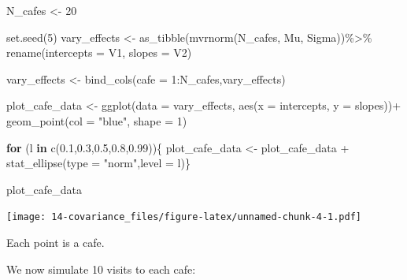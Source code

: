 \documentclass[
]{book}
\newenvironment{Shaded}{\begin{snugshade}}{\end{snugshade}}
\newcommand{\AttributeTok}[1]{\textcolor[rgb]{0.77,0.63,0.00}{#1}}
\newcommand{\ControlFlowTok}[1]{\textcolor[rgb]{0.13,0.29,0.53}{\textbf{#1}}}
\newcommand{\DecValTok}[1]{\textcolor[rgb]{0.00,0.00,0.81}{#1}}
\newcommand{\FloatTok}[1]{\textcolor[rgb]{0.00,0.00,0.81}{#1}}
\newcommand{\FunctionTok}[1]{\textcolor[rgb]{0.00,0.00,0.00}{#1}}
\newcommand{\NormalTok}[1]{#1}
\newcommand{\OtherTok}[1]{\textcolor[rgb]{0.56,0.35,0.01}{#1}}
\newcommand{\SpecialCharTok}[1]{\textcolor[rgb]{0.00,0.00,0.00}{#1}}
\newcommand{\StringTok}[1]{\textcolor[rgb]{0.31,0.60,0.02}{#1}}
\begin{document}
\begin{Shaded}
\begin{Highlighting}[]
\NormalTok{N\_cafes }\OtherTok{\textless{}{-}} \DecValTok{20}

\FunctionTok{set.seed}\NormalTok{(}\DecValTok{5}\NormalTok{)}
\NormalTok{vary\_effects }\OtherTok{\textless{}{-}} \FunctionTok{as\_tibble}\NormalTok{(}\FunctionTok{mvrnorm}\NormalTok{(N\_cafes, Mu, Sigma))}\SpecialCharTok{\%\textgreater{}\%}
  \FunctionTok{rename}\NormalTok{(}\AttributeTok{intercepts =}\NormalTok{ V1, }\AttributeTok{slopes =}\NormalTok{ V2)}

\NormalTok{vary\_effects }\OtherTok{\textless{}{-}} \FunctionTok{bind\_cols}\NormalTok{(}\AttributeTok{cafe =} \DecValTok{1}\SpecialCharTok{:}\NormalTok{N\_cafes,vary\_effects)}

\NormalTok{plot\_cafe\_data }\OtherTok{\textless{}{-}} \FunctionTok{ggplot}\NormalTok{(}\AttributeTok{data =}\NormalTok{ vary\_effects, }\FunctionTok{aes}\NormalTok{(}\AttributeTok{x =}\NormalTok{ intercepts, }\AttributeTok{y =}\NormalTok{ slopes))}\SpecialCharTok{+}
  \FunctionTok{geom\_point}\NormalTok{(}\AttributeTok{col =} \StringTok{"blue"}\NormalTok{, }\AttributeTok{shape =} \DecValTok{1}\NormalTok{)}

  \ControlFlowTok{for}\NormalTok{ (l }\ControlFlowTok{in} \FunctionTok{c}\NormalTok{(}\FloatTok{0.1}\NormalTok{,}\FloatTok{0.3}\NormalTok{,}\FloatTok{0.5}\NormalTok{,}\FloatTok{0.8}\NormalTok{,}\FloatTok{0.99}\NormalTok{))\{}
\NormalTok{  plot\_cafe\_data }\OtherTok{\textless{}{-}}\NormalTok{ plot\_cafe\_data }\SpecialCharTok{+} 
    \FunctionTok{stat\_ellipse}\NormalTok{(}\AttributeTok{type =} \StringTok{"norm"}\NormalTok{,}\AttributeTok{level =}\NormalTok{ l)\}}

\NormalTok{plot\_cafe\_data}
\end{Highlighting}
\end{Shaded}

\texttt{[image: 14-covariance\_files/figure-latex/unnamed-chunk-4-1.pdf]}

Each point is a cafe.

We now simulate 10 visits to each cafe:
\end{document}
